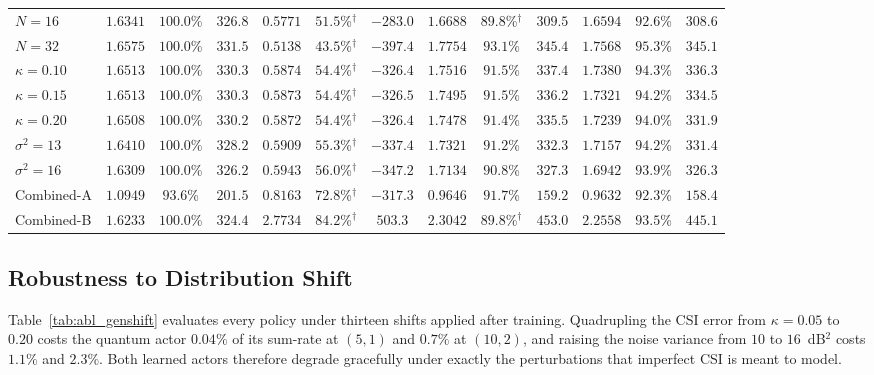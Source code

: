\documentclass[12pt,onecolumn]{IEEEtran}
\begin{document}
\begin{table}[!t]
\begin{tabular}{lcccccccccccc}
\cmidrule(lr){1-13}
$N=16$ & $1.6341$ & $100.0$\% & $\mathbf{326.8}$ & $0.5771$ & $51.5$\%$^{\dagger}$ & $-283.0$ & $1.6688$ & $89.8$\%$^{\dagger}$ & $309.5$ & $1.6594$ & $92.6$\% & $308.6$ \\
$N=32$ & $1.6575$ & $100.0$\% & $331.5$ & $0.5138$ & $43.5$\%$^{\dagger}$ & $-397.4$ & $1.7754$ & $93.1$\% & $\mathbf{345.4}$ & $1.7568$ & $95.3$\% & $345.1$ \\
\cmidrule(lr){1-13}
$\kappa=0.10$ & $1.6513$ & $100.0$\% & $330.3$ & $0.5874$ & $54.4$\%$^{\dagger}$ & $-326.4$ & $1.7516$ & $91.5$\% & $\mathbf{337.4}$ & $1.7380$ & $94.3$\% & $336.3$ \\
$\kappa=0.15$ & $1.6513$ & $100.0$\% & $330.3$ & $0.5873$ & $54.4$\%$^{\dagger}$ & $-326.5$ & $1.7495$ & $91.5$\% & $\mathbf{336.2}$ & $1.7321$ & $94.2$\% & $334.5$ \\
$\kappa=0.20$ & $1.6508$ & $100.0$\% & $330.2$ & $0.5872$ & $54.4$\%$^{\dagger}$ & $-326.4$ & $1.7478$ & $91.4$\% & $\mathbf{335.5}$ & $1.7239$ & $94.0$\% & $331.9$ \\
\cmidrule(lr){1-13}
$\sigma^2=13$ & $1.6410$ & $100.0$\% & $328.2$ & $0.5909$ & $55.3$\%$^{\dagger}$ & $-337.4$ & $1.7321$ & $91.2$\% & $\mathbf{332.3}$ & $1.7157$ & $94.2$\% & $331.4$ \\
$\sigma^2=16$ & $1.6309$ & $100.0$\% & $326.2$ & $0.5943$ & $56.0$\%$^{\dagger}$ & $-347.2$ & $1.7134$ & $90.8$\% & $\mathbf{327.3}$ & $1.6942$ & $93.9$\% & $326.3$ \\
\cmidrule(lr){1-13}
Combined-A & $1.0949$ & $93.6$\% & $\mathbf{201.5}$ & $0.8163$ & $72.8$\%$^{\dagger}$ & $-317.3$ & $0.9646$ & $91.7$\% & $159.2$ & $0.9632$ & $92.3$\% & $158.4$ \\
Combined-B & $1.6233$ & $100.0$\% & $324.4$ & $2.7734$ & $84.2$\%$^{\dagger}$ & $\mathbf{503.3}$ & $2.3042$ & $89.8$\%$^{\dagger}$ & $453.0$ & $2.2558$ & $93.5$\% & $445.1$ \\
\bottomrule
\end{tabular}
\end{table}

\subsection{Robustness to Distribution Shift}
\label{sec:results_shift}

Table~\ref{tab:abl_genshift} evaluates every policy under thirteen shifts applied after
training. Quadrupling the CSI error from
$\kappa=0.05$ to $0.20$ costs the quantum actor $0.04\%$ of its sum-rate at $(5,1)$ and
$0.7\%$ at $(10,2)$, and raising the noise variance from $10$ to $16$~dB$^2$ costs $1.1\%$
and $2.3\%$. Both learned actors therefore degrade gracefully under exactly the
perturbations that imperfect CSI is meant to model.
\end{document}
